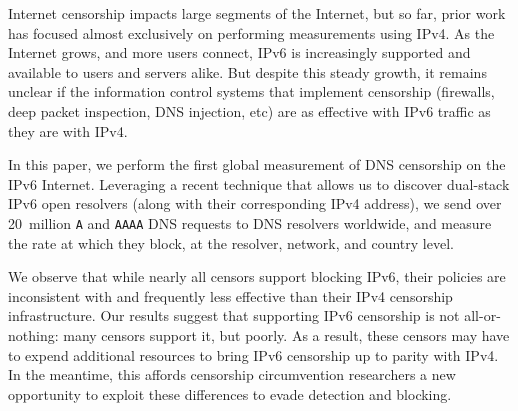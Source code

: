 

Internet censorship impacts large segments of the Internet, but so far, prior
work has focused almost exclusively on performing measurements using IPv4. As the
Internet grows, and more users connect, IPv6 is increasingly supported and
available to users and servers alike. But despite this steady growth, it remains
unclear if the information control systems that implement censorship (firewalls,
deep packet inspection, DNS injection, etc) are as effective with IPv6 traffic
as they are with IPv4.

In this paper, we perform the first global measurement of DNS censorship on the
IPv6 Internet. Leveraging a recent technique that allows us to discover
dual-stack IPv6 open resolvers (along with their corresponding IPv4 address), we send
over 20~million {\tt A} and {\tt AAAA} DNS requests to DNS resolvers worldwide,
and measure the rate at which they block, at the resolver, network, and country
level.

We observe that while nearly all censors support blocking IPv6, their policies
are inconsistent with and frequently less effective than their IPv4 censorship
infrastructure. Our results suggest that supporting IPv6 censorship is not
all-or-nothing: many censors support it, but poorly.  As a result, these censors
may have to expend additional resources to bring IPv6 censorship up to parity
with IPv4. In the meantime, this affords censorship circumvention researchers a
new opportunity to exploit these differences to evade detection and blocking.

